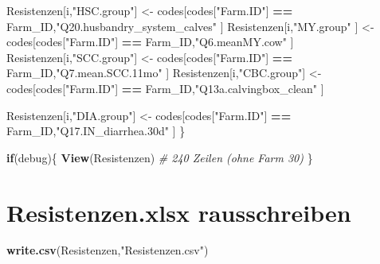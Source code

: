 \documentclass[
]{article}
\newenvironment{Shaded}{\begin{snugshade}}{\end{snugshade}}
\newcommand{\CommentTok}[1]{\textcolor[rgb]{0.56,0.35,0.01}{\textit{#1}}}
\newcommand{\ControlFlowTok}[1]{\textcolor[rgb]{0.13,0.29,0.53}{\textbf{#1}}}
\newcommand{\KeywordTok}[1]{\textcolor[rgb]{0.13,0.29,0.53}{\textbf{#1}}}
\newcommand{\NormalTok}[1]{#1}
\newcommand{\OperatorTok}[1]{\textcolor[rgb]{0.81,0.36,0.00}{\textbf{#1}}}
\newcommand{\StringTok}[1]{\textcolor[rgb]{0.31,0.60,0.02}{#1}}
\begin{document}
\begin{Shaded}
\begin{Highlighting}[]
\NormalTok{  Resistenzen[i,}\StringTok{"HSC.group"}\NormalTok{] <-}\StringTok{ }\NormalTok{codes[codes[}\StringTok{"Farm.ID"}\NormalTok{] }\OperatorTok{==}\StringTok{ }\NormalTok{Farm_ID,}\StringTok{"Q20.husbandry_system_calves"}\NormalTok{ ]  }
\NormalTok{  Resistenzen[i,}\StringTok{"MY.group"}\NormalTok{ ] <-}\StringTok{ }\NormalTok{codes[codes[}\StringTok{"Farm.ID"}\NormalTok{] }\OperatorTok{==}\StringTok{ }\NormalTok{Farm_ID,}\StringTok{"Q6.meanMY.cow"}\NormalTok{               ]              }
\NormalTok{  Resistenzen[i,}\StringTok{"SCC.group"}\NormalTok{] <-}\StringTok{ }\NormalTok{codes[codes[}\StringTok{"Farm.ID"}\NormalTok{] }\OperatorTok{==}\StringTok{ }\NormalTok{Farm_ID,}\StringTok{"Q7.mean.SCC.11mo"}\NormalTok{            ]   }
\NormalTok{  Resistenzen[i,}\StringTok{"CBC.group"}\NormalTok{] <-}\StringTok{ }\NormalTok{codes[codes[}\StringTok{"Farm.ID"}\NormalTok{] }\OperatorTok{==}\StringTok{ }\NormalTok{Farm_ID,}\StringTok{"Q13a.calvingbox_clean"}\NormalTok{       ]      }

\NormalTok{  Resistenzen[i,}\StringTok{"DIA.group"}\NormalTok{] <-}\StringTok{ }\NormalTok{codes[codes[}\StringTok{"Farm.ID"}\NormalTok{] }\OperatorTok{==}\StringTok{ }\NormalTok{Farm_ID,}\StringTok{"Q17.IN_diarrhea.30d"}\NormalTok{ ]       }
\NormalTok{\}}

\ControlFlowTok{if}\NormalTok{(debug)\{}
  \KeywordTok{View}\NormalTok{(Resistenzen)     }\CommentTok{# 240 Zeilen (ohne Farm 30)}
\NormalTok{\}}
\end{Highlighting}
\end{Shaded}

\hypertarget{resistenzen.xlsx-rausschreiben}{%
\section{Resistenzen.xlsx
rausschreiben}\label{resistenzen.xlsx-rausschreiben}}

\begin{Shaded}
\begin{Highlighting}[]
\KeywordTok{write.csv}\NormalTok{(Resistenzen,}\StringTok{"Resistenzen.csv"}\NormalTok{)}
\end{Highlighting}
\end{Shaded}
\end{document}
